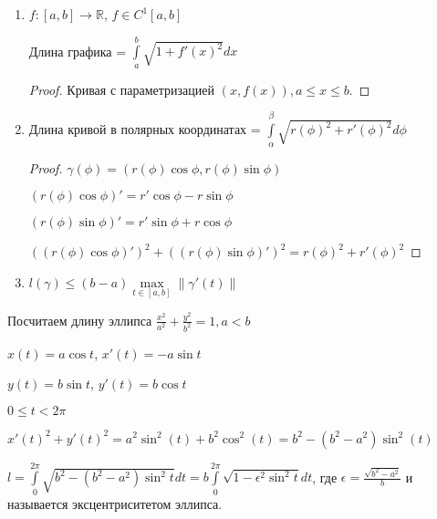     \begin{enumerate}

        \item $f: [a,b] \rightarrow \mathbb{R}$, $f \in C^1[a,b]$
    
        Длина графика = $\int\limits_a^b \sqrt{1 + f'(x)^2} dx$

        \begin{proof}

            Кривая с параметризацией $(x, f(x)), a \le x \le b$.    

        \end{proof}

        \item Длина кривой в полярных координатах = $\int\limits_\alpha^\beta \sqrt{r(\phi)^2 + r'(\phi)^2} d\phi$

        \begin{proof}

            $\gamma(\phi) = (r(\phi) \cos \phi, r(\phi) \sin \phi)$

            $(r(\phi) \cos \phi)' = r' \cos \phi - r \sin \phi$

            $(r(\phi) \sin \phi)' = r' \sin \phi + r \cos \phi$

            $((r(\phi) \cos \phi)')^2 + ((r(\phi) \sin \phi)')^2 = r(\phi)^2 + r'(\phi)^2$

        \end{proof}

        \item $l(\gamma) \le (b-a) \max\limits_{t \in [a,b]} \|\gamma'(t)\|$
    
    \end{enumerate}

    \begin{exmp}
    
        Посчитаем длину эллипса $\frac{x^2}{a^2} + \frac{y^2}{b^2} = 1, a < b$

        $x(t) = a\cos t$, $x'(t) = -a\sin t$

        $y(t) = b\sin t$, $y'(t) = b\cos t$

        $0 \le t < 2\pi$

        $x'(t)^2 + y'(t)^2 = a^2\sin^2(t) + b^2\cos^2(t) = b^2 - (b^2 - a^2)\sin^2(t)$

        $l = \int\limits_0^{2\pi} \sqrt{b^2 - (b^2 - a^2)\sin^2t} dt = b\int\limits_0^{2\pi}\sqrt{1 - \epsilon^2\sin^2t}dt$,
        где $\epsilon = \frac{\sqrt{b^2-a^2}}{b}$ и называется эксцентриситетом эллипса.

    \end{exmp}

